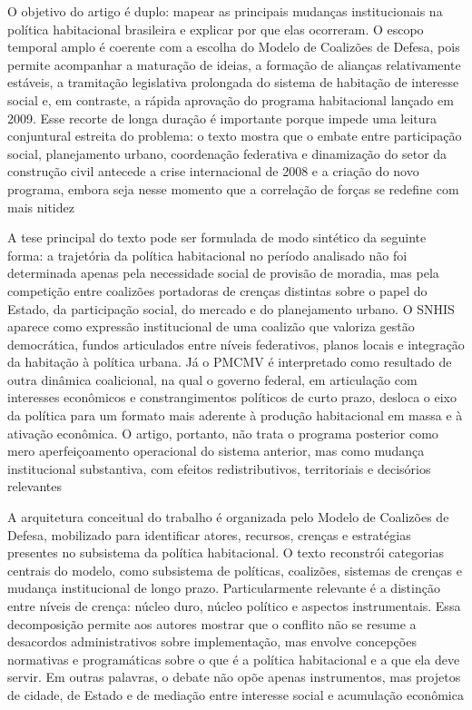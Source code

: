 \documentclass[12pt,a4paper]{article}
\begin{document}
O objetivo do artigo é duplo: mapear as principais mudanças institucionais na política habitacional brasileira e explicar por que elas ocorreram. O escopo temporal amplo é coerente com a escolha do Modelo de Coalizões de Defesa, pois permite acompanhar a maturação de ideias, a formação de alianças relativamente estáveis, a tramitação legislativa prolongada do sistema de habitação de interesse social e, em contraste, a rápida aprovação do programa habitacional lançado em 2009. Esse recorte de longa duração é importante porque impede uma leitura conjuntural estreita do problema: o texto mostra que o embate entre participação social, planejamento urbano, coordenação federativa e dinamização do setor da construção civil antecede a crise internacional de 2008 e a criação do novo programa, embora seja nesse momento que a correlação de forças se redefine com mais nitidez\parencite{ferreira2019_politica_habitacional}

A tese principal do texto pode ser formulada de modo sintético da seguinte forma: a trajetória da política habitacional no período analisado não foi determinada apenas pela necessidade social de provisão de moradia, mas pela competição entre coalizões portadoras de crenças distintas sobre o papel do Estado, da participação social, do mercado e do planejamento urbano. O SNHIS aparece como expressão institucional de uma coalizão que valoriza gestão democrática, fundos articulados entre níveis federativos, planos locais e integração da habitação à política urbana. Já o PMCMV é interpretado como resultado de outra dinâmica coalicional, na qual o governo federal, em articulação com interesses econômicos e constrangimentos políticos de curto prazo, desloca o eixo da política para um formato mais aderente à produção habitacional em massa e à ativação econômica. O artigo, portanto, não trata o programa posterior como mero aperfeiçoamento operacional do sistema anterior, mas como mudança institucional substantiva, com efeitos redistributivos, territoriais e decisórios relevantes\parencite{ferreira2019_politica_habitacional}

A arquitetura conceitual do trabalho é organizada pelo Modelo de Coalizões de Defesa, mobilizado para identificar atores, recursos, crenças e estratégias presentes no subsistema da política habitacional. O texto reconstrói categorias centrais do modelo, como subsistema de políticas, coalizões, sistemas de crenças e mudança institucional de longo prazo. Particularmente relevante é a distinção entre níveis de crença: núcleo duro, núcleo político e aspectos instrumentais. Essa decomposição permite aos autores mostrar que o conflito não se resume a desacordos administrativos sobre implementação, mas envolve concepções normativas e programáticas sobre o que é a política habitacional e a que ela deve servir. Em outras palavras, o debate não opõe apenas instrumentos, mas projetos de cidade, de Estado e de mediação entre interesse social e acumulação econômica\parencite{ferreira2019_politica_habitacional}
\end{document}
